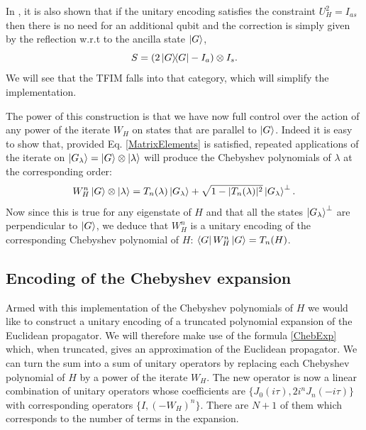 \documentclass[a4paper,11pt]{article}
\begin{document}
In \cite{Low2019hamiltonian}, it is also shown that if the unitary encoding satisfies the constraint $U^2_H = I_{as}$ then there is no need for an additional qubit and the correction is simply given by the reflection w.r.t to the ancilla state $\ket{G}$, 
\begin{equation}
    S = (2\ketbra{G}{G}- I_a)\otimes I_s.
\end{equation}
We will see that the TFIM falls into that category, which will simplify the implementation. 

The power of this construction is that we have now full control over the action of any power of the iterate $W_H$ on states that are parallel to $\ket{G}$. Indeed it is easy to show that, provided Eq. \eqref{MatrixElements} is satisfied,  repeated applications of the iterate on $\ket{G_\lambda} = \ket{G}\otimes \ket{\lambda}$ will produce the Chebyshev polynomials of $\lambda$ at the corresponding order:
\begin{equation}
    W_H^n\ket{G}\otimes \ket{\lambda}=T_n(\lambda)\ket{G_\lambda}+\sqrt{1-|T_n(\lambda)|^2}\ket{G_\lambda}^\perp.
\end{equation}
Now since this is true for any eigenstate of $H$ and that all the states $\ket{G_\lambda}^\perp$ are perpendicular to $\ket{G}$, we deduce that $W_H^n$ is a unitary encoding of the corresponding Chebyshev polynomial of $H$: $\bra{G}W_H^n\ket{G} = T_n(H)$.



\subsection{Encoding of the Chebyshev expansion}
\label{sec:encoding}

Armed with this implementation of the Chebyshev polynomials of $H$ we would like to construct a unitary encoding of a truncated polynomial expansion of the Euclidean propagator. We will therefore make use of the formula \eqref{ChebExp} which, when truncated, gives an approximation of the Euclidean propagator. We can turn the sum into a sum of unitary operators by replacing each Chebyshev polynomial of $H$ by a power of the iterate $W_H$. The new operator is now a linear combination of unitary operators whose coefficients are $\{J_0(i\tau), 2i^nJ_n(-i\tau)\}$ with corresponding operators $\{I, (-W_H)^n\}$. There are $N + 1$ of them which corresponds to the number of terms in the expansion. 
\end{document}
